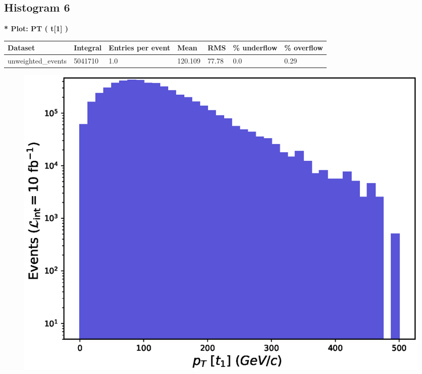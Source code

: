 \documentclass[a4paper, 10pt]{article}
\begin{document}
\subsection{ Histogram 6}

\textbf{* Plot: PT ( t[1] ) }\\
   \begin{table}[H]
  \begin{center}
    \begin{tabular}{|m{23.0mm}|m{23.0mm}|m{18.0mm}|m{19.0mm}|m{19.0mm}|m{19.0mm}|m{19.0mm}|}
      \hline
      {\cellcolor{yellow}         Dataset}& {\cellcolor{yellow}         Integral}& {\cellcolor{yellow}         Entries per event}& {\cellcolor{yellow}         Mean}& {\cellcolor{yellow}         RMS}& {\cellcolor{yellow}         \% underflow}& {\cellcolor{yellow}         \% overflow}\\
      \hline
      {\cellcolor{white}         unweighted\_events}& {\cellcolor{white}         5041710}& {\cellcolor{white}         1.0}& {\cellcolor{white}         120.109}& {\cellcolor{white}         77.78}& {\cellcolor{green}         0.0}& {\cellcolor{green}         0.29}\\
\hline
    \end{tabular}
  \end{center}
\end{table}

\begin{figure}[H]
  \begin{center}
    \includegraphics[scale=0.45]{selection_5.eps}\\
\caption{   }
  \end{center}
\end{figure}
      \newpage
\end{document}

